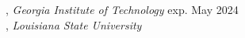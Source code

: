 
, \textit{Georgia Institute of Technology}	\hfill exp. May 2024 \\
, \textit{Louisiana State University} \\

